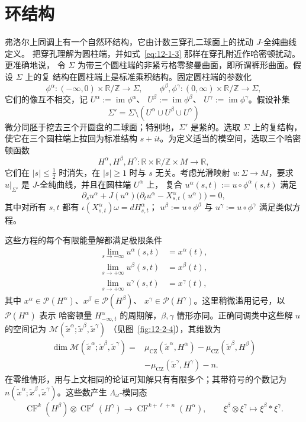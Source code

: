 
\section{环结构}\label{sec:12-2}

弗洛尔上同调上有一个自然环结构，它由计数三穿孔二球面上的扰动 $J$-全纯曲线定义。
把穿孔理解为圆柱端，并如式~\eqref{eq:12-1-3} 那样在穿孔附近作哈密顿扰动。更准确地说，
令 $\Sigma$ 为带三个圆柱端的非紧亏格零黎曼曲面，即所谓裤形曲面。假设 $\Sigma$ 上的复
结构在圆柱端上是标准乘积结构。固定圆柱端的参数化
\[
  \phi^\alpha:(-\infty,0)\times\mathbb R/\mathbb Z\longrightarrow\Sigma,
  \qquad
  \phi^\beta,\phi^\gamma:(0,\infty)\times\mathbb R/\mathbb Z\longrightarrow\Sigma,
\]
它们的像互不相交，记
$U^\alpha:=\operatorname{im}\phi^\alpha$、
$U^\beta:=\operatorname{im}\phi^\beta$、
$U^\gamma:=\operatorname{im}\phi^\gamma$。假设补集
\[
  \Sigma'=\Sigma\setminus(U^\alpha\cup U^\beta\cup U^\gamma)
\]
微分同胚于挖去三个开圆盘的二球面；特别地，$\Sigma'$ 是紧的。选取 $\Sigma$ 上的复结构，
使它在三个圆柱端上拉回为标准结构 $s+it$。为定义适当的模空间，选取三个哈密顿函数
\[
  H^\alpha,H^\beta,H^\gamma:
  \mathbb R\times\mathbb R/\mathbb Z\times M\longrightarrow\mathbb R,
\]
它们在 $|s|\leq\tfrac12$ 时消失，在 $|s|\geq1$ 时与 $s$ 无关。考虑光滑映射
$u:\Sigma\to M$，要求 $u|_{\Sigma'}$ 是 $J$-全纯曲线，并且在圆柱端 $U^\alpha$ 上，
复合 $u^\alpha(s,t):=u\circ\phi^\alpha(s,t)$ 满足
\[
  \partial_su^\alpha+J(u^\alpha)
  \bigl(\partial_tu^\alpha-X^\alpha_{s,t}(u^\alpha)\bigr)=0,
\]
其中对所有 $s,t$ 都有 $\iota(X^\alpha_{s,t})\omega=dH^\alpha_{s,t}$；
$u^\beta:=u\circ\phi^\beta$ 与 $u^\gamma:=u\circ\phi^\gamma$ 满足类似方程。

这些方程的每个有限能量解都满足极限条件
\[
\begin{split}
  \lim_{s\to-\infty}u^\alpha(s,t)&=x^\alpha(t),\\
  \lim_{s\to+\infty}u^\beta(s,t)&=x^\beta(t),\\
  \lim_{s\to+\infty}u^\gamma(s,t)&=x^\gamma(t),
\end{split}
\]
其中 $x^\alpha\in\mathcal P(H^\alpha)$、$x^\beta\in\mathcal P(H^\beta)$、
$x^\gamma\in\mathcal P(H^\gamma)$。这里稍微滥用记号，以 $\mathcal P(H^\alpha)$ 表示
哈密顿量 $H^\alpha_{-\infty,t}$ 的周期解，$\beta,\gamma$ 情形亦同。正确同调类中这些解
$u$ 的空间记为
$\mathcal M(\widetilde x^\alpha;\widetilde x^\beta,\widetilde x^\gamma)$
（见图~\ref{fig:12-2-4}），其维数为
\[
\begin{split}
  \dim\mathcal M(\widetilde x^\alpha;\widetilde x^\beta,\widetilde x^\gamma)
  ={}&\mu_{\mathrm{CZ}}(\widetilde x^\alpha,H^\alpha)
  -\mu_{\mathrm{CZ}}(\widetilde x^\beta,H^\beta)\\
  &-\mu_{\mathrm{CZ}}(\widetilde x^\gamma,H^\gamma)-n.
\end{split}
\]
在零维情形，用与上文相同的论证可知解只有有限多个；其带符号的个数记为
$n(\widetilde x^\alpha;\widetilde x^\beta,\widetilde x^\gamma)$。这些数产生
$\Lambda_\omega$-模同态
\[
  \operatorname{CF}^k(H^\beta)\otimes\operatorname{CF}^\ell(H^\gamma)
  \longrightarrow\operatorname{CF}^{k+\ell+n}(H^\alpha),
  \qquad \xi^\beta\otimes\xi^\gamma\longmapsto\xi^\beta*\xi^\gamma.
\]

